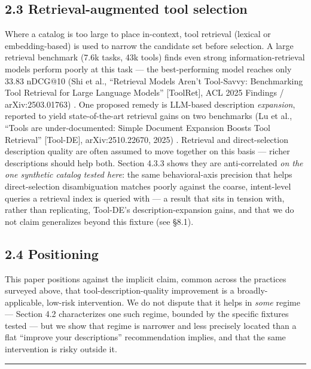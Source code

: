 \hypertarget{retrieval-augmented-tool-selection}{%
\subsection{2.3 Retrieval-augmented tool
selection}\label{retrieval-augmented-tool-selection}}

Where a catalog is too large to place in-context, tool retrieval
(lexical or embedding-based) is used to narrow the candidate set before
selection. A large retrieval benchmark (7.6k tasks, 43k tools) finds
even strong information-retrieval models perform poorly at this task ---
the best-performing model reaches only 33.83 nDCG@10 (Shi et al.,
``Retrieval Models Aren't Tool-Savvy: Benchmarking Tool Retrieval for
Large Language Models'' {[}ToolRet{]}, ACL 2025 Findings /
arXiv:2503.01763) \nocite{shi2025toolret}. One proposed remedy is LLM-based description
\emph{expansion}, reported to yield state-of-the-art retrieval gains on
two benchmarks (Lu et al., ``Tools are under-documented: Simple Document
Expansion Boosts Tool Retrieval'' {[}Tool-DE{]}, arXiv:2510.22670,
2025) \nocite{lu2025toolde}. Retrieval and direct-selection description quality are often
assumed to move together on this basis --- richer descriptions should
help both. Section 4.3.3 shows they are anti-correlated \emph{on the one
synthetic catalog tested here}: the same behavioral-axis precision that
helps direct-selection disambiguation matches poorly against the coarse,
intent-level queries a retrieval index is queried with --- a result that
sits in tension with, rather than replicating, Tool-DE's
description-expansion gains, and that we do not claim generalizes beyond
this fixture (see §8.1).

\hypertarget{positioning}{%
\subsection{2.4 Positioning}\label{positioning}}

This paper positions against the implicit claim, common across the
practices surveyed above, that tool-description-quality improvement is a
broadly-applicable, low-risk intervention. We do not dispute that it
helps in \emph{some} regime --- Section 4.2 characterizes one such
regime, bounded by the specific fixtures tested --- but we show that
regime is narrower and less precisely located than a flat ``improve your
descriptions'' recommendation implies, and that the same intervention is
risky outside it.

\begin{center}\rule{0.5\linewidth}{0.5pt}\end{center}

